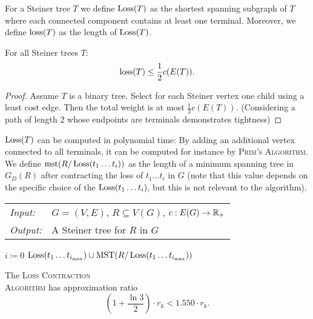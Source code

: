 \documentclass[../skript.tex]{subfiles}
\begin{document}
For a Steiner tree $T$ we define $\operatorname{Loss}(T)$ as the shortest spanning subgraph of $T$ where each connected component contains at least one terminal. Moreover, we define $\operatorname{loss}(T)$ as the length of $\operatorname{Loss}(T)$.
\begin{lemma} %
\label{thm:78}
For all Steiner trees $T$:
\[
	\operatorname{loss}(T) \leq \frac{1}{2} c(E(T)).
\]
\end{lemma}
\begin{proof}
Assume $T$ is a binary tree. Select for each Steiner vertex one child using a least cost edge. Then the total weight is at most $\frac{1}{2} c(E(T))$. (Considering a path of length 2 whose endpoints are terminals demonstrates tightness)
\end{proof}
$\operatorname{Loss}(T)$ can be computed in polynomial time: By adding an additional vertex connected to all terminals, it can be computed for instance by \textsc{Prim's Algorithm}.
We define $\operatorname{mst}(R/\operatorname{Loss}(t_1 \ldots t_i))$ as the length of a minimum spanning tree in $G_D(R)$ after contracting the loss of $t_1 \ldots t_i$ in $G$ (note that this value depends on the specific choice of the $\operatorname{Loss}(t_1 \ldots t_i)$, but this is not relevant to the algorithm).
\begin{samepage}
\begin{algorithmbox}
\begin{tabular}{@{}ll}
\textit{Input:} & $G = (V, E)$, $R \subseteq V(G)$, $c : E(G) \to \mathbb{R}_+$\\
\textit{Output:} & A Steiner tree for $R$ in $G$
\end{tabular}
\end{algorithmbox}
\vspace{-7pt}
\begin{algorithm}[H]
$i \coloneqq 0$\;
\Return $\operatorname{Loss}(t_1 \ldots t_{i_{\max}}) \cup \operatorname{MST}(R/\operatorname{Loss}(t_1 \ldots t_{i_{\max}}))$\;
\end{algorithm}
\vspace{-7pt}
\EndAlgorithmLine
\end{samepage}
\begin{theorem} %
\label{thm:79}
The \textsc{Loss Contraction\\Algorithm} has approximation ratio
\[
	\left( 1 + \frac{\ln 3}{2} \right) \cdot r_k < 1.550 \cdot r_k.
\]
\end{theorem}
\end{document}
